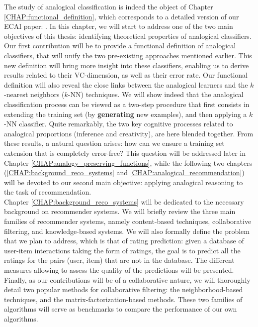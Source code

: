 The study of analogical classification is indeed the object of Chapter
\ref{CHAP:functional_definition}, which corresponds to a detailed version of our
ECAI paper: \cite{HugPraRicSerECAI16}. In this chapter, we will start to
address one of the two main objectives of this thesis: identifying theoretical
properties of analogical classifiers. Our first contribution will be to provide
a functional definition of analogical classifiers, that will unify the two
pre-existing approaches mentioned earlier. This new definition will bring more
insight into these classifiers, enabling us to derive results related to their
VC-dimension, as well as their error rate. Our functional definition will also
reveal the close links between the analogical learners and the $k$-nearest
neighbors ($k$-NN) techniques. We will show indeed that the analogical
classification process can be viewed as a two-step procedure that first
consists in extending the training
set (by \textbf{generating} new examples), and then applying a $k$-NN
classifier. Quite remarkably, the two key cognitive processes related to
analogical proportions (inference and creativity),
are here blended together. From these results, a natural question arises: how
can we ensure a training set extension that is completely error-free? This
question will be addressed later in Chapter
\ref{CHAP:analogy_preserving_functions}, while the  following two chapters
(\ref{CHAP:background_reco_systems} and \ref{CHAP:analogical_recommendation})
will be devoted to our second main objective: applying analogical reasoning to
the task of recommendation.\\

Chapter \ref{CHAP:background_reco_systems} will be dedicated to the necessary
background on recommender systems. We will briefly review the three main
families of recommender systems, namely content-based techniques, collaborative
filtering, and knowledge-based systems. We will also formally define the
problem that we plan to address, which is that of rating prediction: given a
database of  user-item interactions taking the form of ratings, the goal is to
predict all the ratings for the pairs (user, item) that are not in the
database. The different measures allowing to assess the quality of the
predictions will be presented. Finally, as our contributions will be of a
collaborative nature, we will thoroughly detail two popular methods for
collaborative filtering: the neighborhood-based techniques, and the
matrix-factorization-based methods. These two families of algorithms will serve
as benchmarks to compare the performance of our own algorithms.\\

